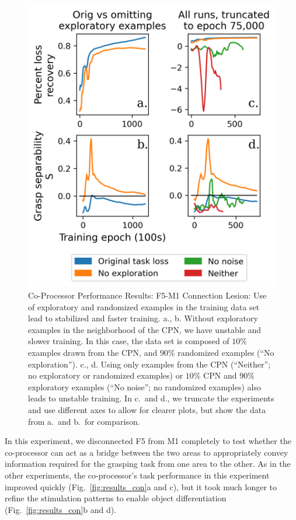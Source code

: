 \documentclass[12pt]{iopart}
\begin{document}
\begin{figure}[h]
\centering
\includegraphics[scale=1]{training_results_no_explore.png}
\caption{Co-Processor Performance Results: F5-M1 Connection Lesion: Use of exploratory
         and randomized examples in the training data set lead to stabilized
         and faster training. a., b. Without exploratory examples in the
         neighborhood of the CPN, we have unstable and slower training. In
         this case, the data set is composed of $10\%$ examples drawn from the
         CPN, and $90\%$ randomized examples (``No exploration'').
         c., d. Using only examples from the CPN (``Neither''; no exploratory or randomized examples) or $10\%$ CPN
         and $90\%$ exploratory examples (``No noise''; no randomized examples) also
         leads to unstable training. In c.\ and d., we truncate the experiments and use different
         axes to allow for clearer plots, but show the data from a.\ and b.\ for
         comparison.
         }
\label{fig:results_con_no_explore}
\end{figure}

In this experiment, we disconnected F5 from M1 completely to test whether the co-processor can
act as a bridge between the two areas to appropriately convey information required for the grasping
task from one area to the other. As in the other experiments, the co-processor's task performance in this
experiment improved quickly (Fig.~\ref{fig:results_con}a and c), but it took much longer to refine the
stimulation patterns to enable object differentiation (Fig.~\ref{fig:results_con}b and d). 
\end{document}
